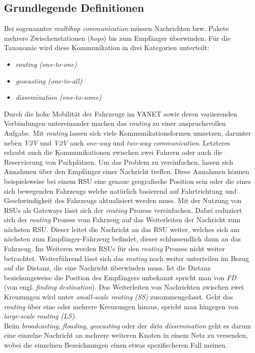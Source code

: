 \documentclass[english,runningheads,a4paper]{llncs}[2018/03/10]
\begin{document}
\subsection{Grundlegende Definitionen}
Bei sogenannter \textit{multihop communication} müssen Nachrichten bzw. Pakete mehrere Zwischenstationen (\textit{hops}) bis zum Empfänger überwinden.
Für die Taxonomie wird diese Kommunikation in drei Kategorien unterteilt:
\begin{itemize}
  \item \textit{routing (one-to-one)}
  \item \textit{geocasting (one-to-all)}
  \item \textit{dissemination (one-to-some)}
\end{itemize}
Durch die hohe Mobilität der Fahrzeuge im VANET sowie deren variierenden Verbindungen untereinander machen das \textit{routing} zu einer anspruchsvollen Aufgabe.
Mit \textit{routing} lassen sich viele Kommunikationsformen umsetzen, darunter neben \textit{V2V} und \textit{V2V} auch \textit{one-way} und \textit{two-way communication}.
Letzteres erlaubt auch die Kommunikationen zwischen zwei Fahrern oder auch die Reservierung von Parkplätzen.
Um das Problem zu vereinfachen, lassen sich Annahmen über den Empfänger einer Nachricht treffen.
Diese Annahmen können beispielsweise bei einem RSU eine genaue geografische Position sein oder die eines sich bewegenden Fahrzeugs welche natürlich basierend auf Fahrtrichtung und Geschwindigkeit des Fahrzeugs aktualisiert werden muss.
Mit der Nutzung von RSUs als Gateways lässt sich der \textit{routing} Prozess vereinfachen.
Dabei reduziert sich der \textit{routing} Prozess vom Fahrzeug auf das Weiterleiten der Nachricht zum nächsten RSU\@.
Dieser leitet die Nachricht an das RSU weiter, welches sich am nächsten zum Empfänger-Fahrzeug befindet, dieser schlussendlich dann an das Fahrzeug.
Im Weiteren werden RSUs für den \textit{routing} Prozess nicht weiter betrachtet.
Weiterführend lässt sich das \textit{routing} noch weiter unterteilen im Bezug auf die Distanz, die eine Nachricht überwinden muss.
Ist die Distanz beziehungsweise die Position des Empfängers unbekannt spricht man von \textit{FD} (von engl. \textit{finding destination}).
Das Weiterleiten von Nachrichten zwischen zwei Kreuzungen wird unter \textit{small-scale routing (SS)} zusammengefasst.
Geht das \textit{routing} über eine oder mehrere Kreuzungen hinaus, spricht man hingegen von \textit{large-scale routing (LS)}.\\
Beim \textit{broadcasting}, \textit{floading}, \textit{geocasting} oder der \textit{data dissemination} geht es darum eine einzelne Nachricht an mehrere weiteren Knoten in einem Netz zu versenden, wobei die einzelnen Bezeichnungen einen etwas spezifischeren Fall meinen.
\end{document}
